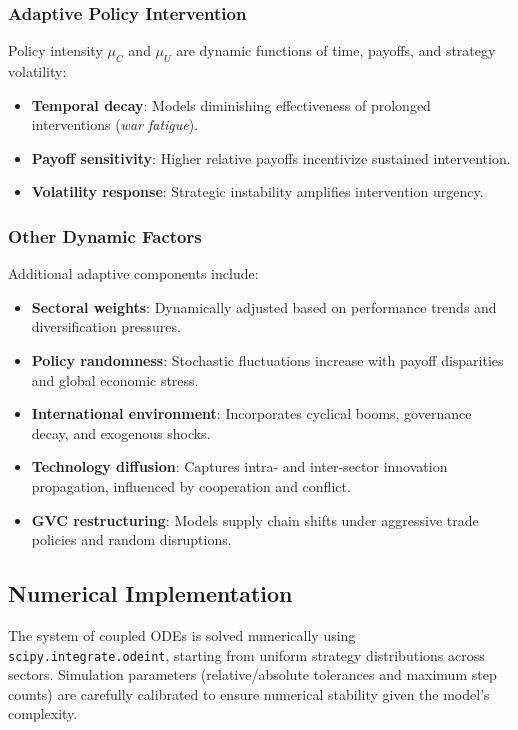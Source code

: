 \documentclass{article}
\begin{document}
\subsubsection{Adaptive Policy Intervention}

Policy intensity \(\mu_C\) and \(\mu_U\) are dynamic functions of time, payoffs, and strategy volatility:
\begin{itemize}
    \item \textbf{Temporal decay}: Models diminishing effectiveness of prolonged interventions (\textit{war fatigue}).
    \item \textbf{Payoff sensitivity}: Higher relative payoffs incentivize sustained intervention.
    \item \textbf{Volatility response}: Strategic instability amplifies intervention urgency.
\end{itemize}

\subsubsection{Other Dynamic Factors}

Additional adaptive components include:
\begin{itemize}
    \item \textbf{Sectoral weights}: Dynamically adjusted based on performance trends and diversification pressures.
    \item \textbf{Policy randomness}: Stochastic fluctuations increase with payoff disparities and global economic stress.
    \item \textbf{International environment}: Incorporates cyclical booms, governance decay, and exogenous shocks.
    \item \textbf{Technology diffusion}: Captures intra- and inter-sector innovation propagation, influenced by cooperation and conflict.
    \item \textbf{GVC restructuring}: Models supply chain shifts under aggressive trade policies and random disruptions.
\end{itemize}

\subsection{Numerical Implementation}

The system of coupled ODEs is solved numerically using \texttt{scipy.integrate.odeint}, starting from uniform strategy distributions across sectors. Simulation parameters (relative/absolute tolerances and maximum step counts) are carefully calibrated to ensure numerical stability given the model’s complexity.
\end{document}
